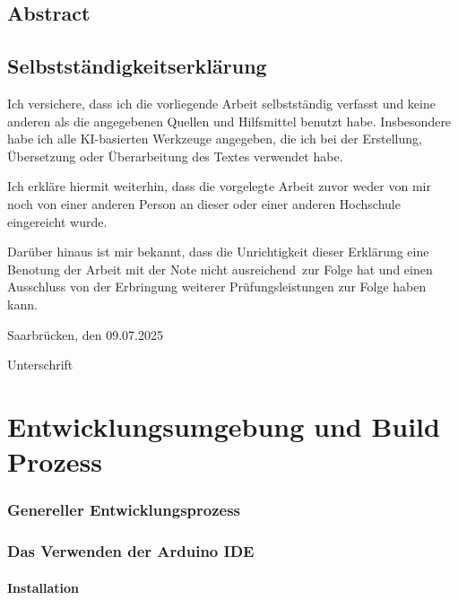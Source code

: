 \documentclass[paper=a4,fontsize=12pt,ngerman]{scrartcl}
\begin{document}
\pagestyle{plain}



\section*{Abstract}


\newpage
\section*{Selbstständigkeitserklärung}
Ich versichere, dass ich die vorliegende Arbeit selbstständig verfasst und 
keine anderen als die angegebenen Quellen und Hilfsmittel benutzt habe.
Insbesondere habe ich alle KI-basierten Werkzeuge angegeben, die ich bei
der Erstellung, Übersetzung oder Überarbeitung des Textes verwendet habe.

Ich erkläre hiermit weiterhin, dass die vorgelegte Arbeit zuvor weder von mir 
noch von einer anderen Person an dieser oder einer anderen Hochschule 
eingereicht wurde.

Darüber hinaus ist mir bekannt, dass die Unrichtigkeit dieser Erklärung eine 
Benotung der Arbeit mit der Note \glqq nicht ausreichend\grqq \ zur Folge hat 
und einen Ausschluss von der Erbringung weiterer Prüfungsleistungen zur Folge 
haben kann.
\bigskip
 
Saarbrücken, den 09.07.2025

\smallskip
Unterschrift


\clearpage
\tableofcontents 

\clearpage
{}

\chapter*{Entwicklungsumgebung und Build Prozess}

\subsection{Genereller Entwicklungsprozess}

\subsection{Das Verwenden der Arduino IDE}

\subsubsection{Installation}
\end{document}
